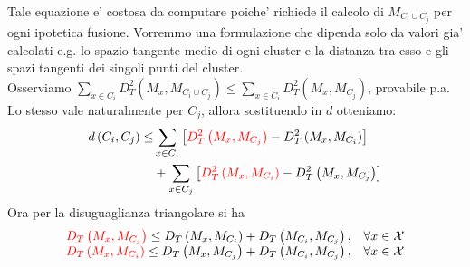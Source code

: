\documentclass[a4, landscape]{seminar}
\theoremstyle{definition}
\def\bs{\begin{slide}\begingroup\small}
\def\es{\endgroup\end{slide}}
\begin{document}
\bs
Tale equazione e' costosa da computare poiche' richiede il calcolo di $M_{C_i\cup C_j}$ per ogni ipotetica fusione.
Vorremmo una formulazione che dipenda solo da valori gia' calcolati e.g. lo spazio tangente medio di ogni cluster e
la distanza tra esso e gli spazi tangenti dei singoli punti del cluster. \\
Osserviamo $\sum_{x \in C_{i}} D_{T}^{2}\left(M_{x}, M_{C_{i} \cup C_{j}}\right) \leq \sum_{x \in C_{i}} D_{T}^{2}\left(M_{x}, M_{C_{j}}\right)$, provabile p.a.
Lo stesso vale naturalmente per $C_j$, allora sostituendo in $d$ otteniamo:
\begin{equation*}
\begin{aligned}
  d\left(C_{i}, C_{j}\right) \leq & \sum_{x \in C_{i}}\left[\textcolor{red}{D_{T}^{2}\left(M_{x}, M_{C_{j}}\right)}-D_{T}^{2}\left(M_{x}, M_{C_{i}}\right)\right] \\
  &+\sum_{x \in C_{j}}\left[\textcolor{red}{D_{T}^{2}\left(M_{x}, M_{C_{i}}\right)}-D_{T}^{2}\left(M_{x}, M_{C_{j}}\right)\right]
  \end{aligned}
\end{equation*}
Ora per la disuguaglianza triangolare si ha
\begin{equation*}
  \begin{array}{ll}
    \textcolor{red}{D_{T}\left(M_{x}, M_{C_{j}}\right)} \leq D_{T}\left(M_{x}, M_{C_{i}}\right)+D_{T}\left(M_{C_{i}}, M_{C_{j}}\right), & \forall x \in \mathcal{X} \\
    \textcolor{red}{D_{T}\left(M_{x}, M_{C_{i}}\right)} \leq D_{T}\left(M_{x}, M_{C_{j}}\right)+D_{T}\left(M_{C_{i}}, M_{C_{j}}\right), & \forall x \in \mathcal{X}
    \end{array}
\end{equation*}
\es
\end{document}
